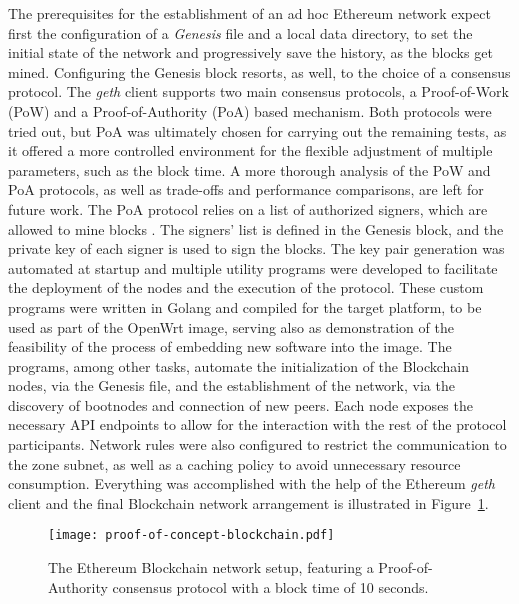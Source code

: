 The prerequisites for the establishment of an ad hoc Ethereum network expect first the configuration of a \emph{Genesis} file and a local data directory, to set the initial state of the network and progressively save the history, as the blocks get mined. Configuring the Genesis block resorts, as well, to the choice of a consensus protocol. The \emph{geth} client supports two main consensus protocols, a Proof-of-Work (PoW) and a Proof-of-Authority (PoA) based mechanism. Both protocols were tried out, but PoA was ultimately chosen for carrying out the remaining tests, as it offered a more controlled environment for the flexible adjustment of multiple parameters, such as the block time. A more thorough analysis of the PoW and PoA protocols, as well as trade-offs and performance comparisons, are left for future work. The PoA protocol relies on a list of authorized signers, which are allowed to mine blocks \cite{clique-eth}. The signers' list is defined in the Genesis block, and the private key of each signer is used to sign the blocks. The key pair generation was automated at startup and multiple utility programs were developed to facilitate the deployment of the nodes and the execution of the protocol. These custom programs were written in Golang and compiled for the target platform, to be used as part of the OpenWrt image, serving also as demonstration of the feasibility of the process of embedding new software into the image. The programs, among other tasks, automate the initialization of the Blockchain nodes, via the Genesis file, and the establishment of the network, via the discovery of bootnodes and connection of new peers. Each node exposes the necessary API endpoints to allow for the interaction with the rest of the protocol participants. Network rules were also configured to restrict the communication to the zone subnet, as well as a caching policy to avoid unnecessary resource consumption. Everything was accomplished with the help of the Ethereum \emph{geth} client and the final Blockchain network arrangement is illustrated in Figure~\ref{fig:pol-implementation:blockchain-network}.

\begin{figure}[h!]
    \begin{center}
    \texttt{[image: proof-of-concept-blockchain.pdf]}
    \caption{The Ethereum Blockchain network setup, featuring a Proof-of-Authority consensus protocol with a block time of 10 seconds.}
    \label{fig:pol-implementation:blockchain-network}
    \end{center}
\end{figure}

